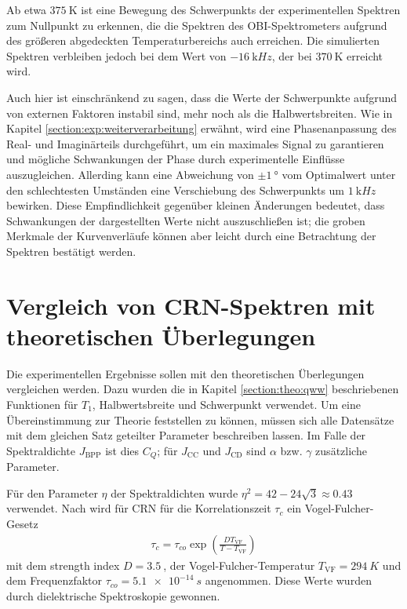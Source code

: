 Ab etwa $\SI{375}{\kelvin}$ ist eine Bewegung des Schwerpunkts der experimentellen Spektren zum Nullpunkt zu erkennen, die die Spektren des OBI-Spektrometers aufgrund des größeren abgedeckten Temperaturbereichs auch erreichen. Die simulierten Spektren verbleiben jedoch bei dem Wert von $\SI{-16}{\kilo Hz}$, der bei $\SI{370}{\kelvin}$ erreicht wird.

Auch hier ist einschränkend zu sagen, dass die Werte der Schwerpunkte aufgrund von externen Faktoren instabil sind, mehr noch als die Halbwertsbreiten. Wie in Kapitel \ref{section:exp:weiterverarbeitung} erwähnt, wird eine Phasenanpassung des Real- und Imaginärteils durchgeführt, um ein maximales Signal zu garantieren und mögliche Schwankungen der Phase durch experimentelle Einflüsse auszugleichen. Allerding kann eine Abweichung von $\pm \SI{1}{\degree}$ vom Optimalwert unter den schlechtesten Umständen eine Verschiebung des Schwerpunkts um $\SI{1}{\kilo Hz}$ bewirken. Diese Empfindlichkeit gegenüber kleinen Änderungen bedeutet, dass Schwankungen der dargestellten Werte nicht auszuschließen ist; die groben Merkmale der Kurvenverläufe können aber leicht durch eine Betrachtung der Spektren bestätigt werden.




\section{Vergleich von CRN-Spektren mit theoretischen Überlegungen} \label{section:res:theorie}

Die experimentellen Ergebnisse sollen mit den theoretischen Überlegungen vergleichen werden. Dazu wurden die in Kapitel \ref{section:theo:qww} beschriebenen Funktionen für $T_1$, Halbwertsbreite und Schwerpunkt verwendet. Um eine Übereinstimmung zur Theorie feststellen zu können, müssen sich alle Datensätze mit dem gleichen Satz geteilter Parameter beschreiben lassen. Im Falle der Spektraldichte $J_\text{BPP}$ ist dies $C_Q$; für $J_\text{CC}$ und $J_\text{CD}$ sind $\alpha$ bzw. $\gamma$ zusätzliche Parameter.

Für den Parameter $\eta$ der Spektraldichten wurde $\eta^2 = 42 - 24 \sqrt{3} \approx \SI{0.43}{}$ \cite{caer} verwendet. Nach \cite{PIMENOV199793} wird für CRN für die Korrelationszeit $\tau_c$ ein Vogel-Fulcher-Gesetz
\begin{align}
	\tau_c = \tau_{co} \exp \left( \frac{D T_\text{VF}}{T-T_\text{VF}} \right)
\end{align}
mit dem strength index $D = \SI{3.5}{}$, der Vogel-Fulcher-Temperatur $T_\text{VF} = \SI{294}{K}$ und dem Frequenzfaktor $\tau_{co} = \SI{5.1e-14}{s}$ angenommen. Diese Werte wurden durch dielektrische Spektroskopie gewonnen.

